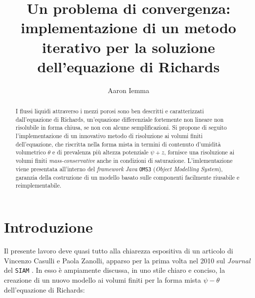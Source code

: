 \documentclass[11pt]{amsart}
\theoremstyle{definition}
\theoremstyle{remark}
\numberwithin{equation}{section}
\begin{document}
\title[Metodo iterativo per l'equazione di Richards]{Un problema di convergenza: implementazione di un metodo iterativo per la soluzione dell'equazione di Richards}
\author{Aaron Iemma}
\address{DICAM, Università degli Studi di Trento, 
Italy}



\begin{abstract}
I flussi liquidi attraverso i mezzi porosi sono ben descritti e caratterizzati dall'equazione di Richards, un'equazione differenziale 
fortemente non lineare non risolubile in forma chiusa, se non con alcune semplificazioni. Si propone di seguito l'implementazione di un innovativo metodo 
di risoluzione ai volumi finiti dell'equazione, che riscritta nella forma mista in termini di contenuto d'umidità volumetrico $\theta$ e di prevalenza più 
altezza potenziale $\psi + z$, fornisce una risoluzione ai volumi finiti \emph{mass-conservative} anche in condizioni di saturazione. L'imlementazione 
viene presentata all'interno del \emph{framework} \emph{Java} \texttt{OMS3} (\emph{Object Modelling System}), garanzia della costruzione di un modello basato 
sulle componenti facilmente riusabile e reimplementabile.
\end{abstract}


\maketitle
\tableofcontents

\newpage
\section{Introduzione}
\label{sec:intro}

Il presente lavoro deve quasi tutto alla chiarezza espositiva di un articolo di Vincenzo Casulli e Paola Zanolli, 
apparso per la prima volta nel 2010 sul \emph{Journal} del \texttt{SIAM} \cite{art:casulli}. 
In esso è ampiamente discussa, in uno stile chiaro e conciso, la creazione di un nuovo modello ai volumi finiti per la forma mista 
$\psi - \theta$ dell'equazione di Richards:
\end{document}
